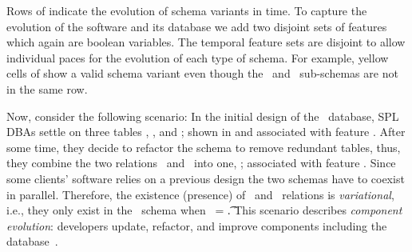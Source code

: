%
Rows of  indicate the evolution of schema variants in time.
To capture the evolution of the software and its database we add 
two disjoint sets of features which again are boolean variables.
The temporal feature sets are disjoint to allow 
individual paces for the evolution of each type of schema. For example,
yellow cells of  show a valid schema variant even though
the \basic\ and \educational\ sub-schemas are not in the same row. 
%

Now, consider the following scenario:
In the initial design of the \basic\ database, SPL  DBAs
settle on three tables \engemp, \othemp, and \job; shown in  and associated
with feature \vOne. 
After some time, they decide
to refactor the schema to remove redundant tables,
thus, they combine the two
relations \engemp\ and \othemp\ into one, \empacct; associated with  feature \vTwo. 
Since some clients' 
software relies on a previous design the two schemas have to coexist in parallel.
Therefore, the existence (presence) of \engemp\ and \othemp\
relations is \emph{variational}, i.e., they only exist in the \basic\
schema when \vOne\ = \t.
This scenario describes \emph{component evolution}:
developers
update, refactor, and improve components including the database~\cite{dbSPLevolve}.

